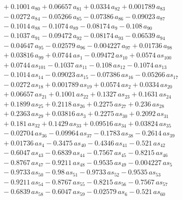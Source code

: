 \documentclass[a4paper,11pt]{article}
\begin{document}
\begin{align}
&\quad + 0.1001\,a_{80} + 0.06657\,a_{81} + 0.0334\,a_{82} + 0.001789\,a_{83} \nonumber\\
&\quad - 0.0272\,a_{84} - 0.05266\,a_{85} - 0.07386\,a_{86} - 0.09023\,a_{87} \nonumber\\
&\quad - 0.1014\,a_{88} - 0.1074\,a_{89} - 0.08174\,a_{9} - 0.108\,a_{90} \nonumber\\
&\quad - 0.1037\,a_{91} - 0.09472\,a_{92} - 0.08174\,a_{93} - 0.06539\,a_{94} \nonumber\\
&\quad - 0.04647\,a_{95} - 0.02579\,a_{96} - 0.004227\,a_{97} + 0.01736\,a_{98} \nonumber\\
&\quad + 0.03816\,a_{99} + 0.0744\,as_{1} - 0.09472\,as_{10} + 0.0574\,as_{100} \nonumber\\
&\quad + 0.0744\,as_{101} - 0.1037\,as_{11} - 0.108\,as_{12} - 0.1074\,as_{13} \nonumber\\
&\quad - 0.1014\,as_{14} - 0.09023\,as_{15} - 0.07386\,as_{16} - 0.05266\,as_{17} \nonumber\\
&\quad - 0.0272\,as_{18} + 0.001789\,as_{19} + 0.0574\,as_{2} + 0.0334\,as_{20} \nonumber\\
&\quad + 0.06657\,as_{21} + 0.1001\,as_{22} + 0.1327\,as_{23} + 0.1631\,as_{24} \nonumber\\
&\quad + 0.1899\,as_{25} + 0.2118\,as_{26} + 0.2275\,as_{27} + 0.236\,as_{28} \nonumber\\
&\quad + 0.2363\,as_{29} + 0.03816\,as_{3} + 0.2275\,as_{30} + 0.2092\,as_{31} \nonumber\\
&\quad + 0.181\,as_{32} + 0.1429\,as_{33} + 0.09516\,as_{34} + 0.03824\,as_{35} \nonumber\\
&\quad - 0.02704\,as_{36} - 0.09964\,as_{37} - 0.1783\,as_{38} - 0.2614\,as_{39} \nonumber\\
&\quad + 0.01736\,as_{4} - 0.3475\,as_{40} - 0.4346\,as_{41} - 0.521\,as_{42} \nonumber\\
&\quad - 0.6047\,as_{43} - 0.6839\,as_{44} - 0.7567\,as_{45} - 0.8215\,as_{46} \nonumber\\
&\quad - 0.8767\,as_{47} - 0.9211\,as_{48} - 0.9535\,as_{49} - 0.004227\,as_{5} \nonumber\\
&\quad - 0.9733\,as_{50} - 0.98\,as_{51} - 0.9733\,as_{52} - 0.9535\,as_{53} \nonumber\\
&\quad - 0.9211\,as_{54} - 0.8767\,as_{55} - 0.8215\,as_{56} - 0.7567\,as_{57} \nonumber\\
&\quad - 0.6839\,as_{58} - 0.6047\,as_{59} - 0.02579\,as_{6} - 0.521\,as_{60} \nonumber\\

\end{align}
\end{document}
